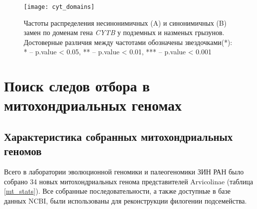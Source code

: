 \begin{figure}[h!]
	\begin{center}
		\texttt{[image: cyt\_domains]}
	\end{center}
	\caption{Частоты распределения несинонимичных (A) и синонимичных (B) замен по доменам гена \textit{CYTB} у подземных и назменых грызунов. Достоверные различия между частотами обозначены звездочками(*): * -- p.value < 0.05, ** -- p.value < 0.01, *** -- p.value < 0.001 }\label{Cyt_Dom_fig}
\end{figure}


\clearpage

\section{Поиск следов отбора в митохондриальных геномах}

\subsection{Характеристика собранных митохондриальных геномов}

Всего в лаборатории эволюционной геномики и палеогеномики ЗИН РАН было собрано 34 новых митохондриальных генома представителей Arvicolinae (таблица \ref{mt_stats}). Все собранные последовательности, а также доступные в базе данных NCBI, были использованы для реконструкции филогении подсемейства.




